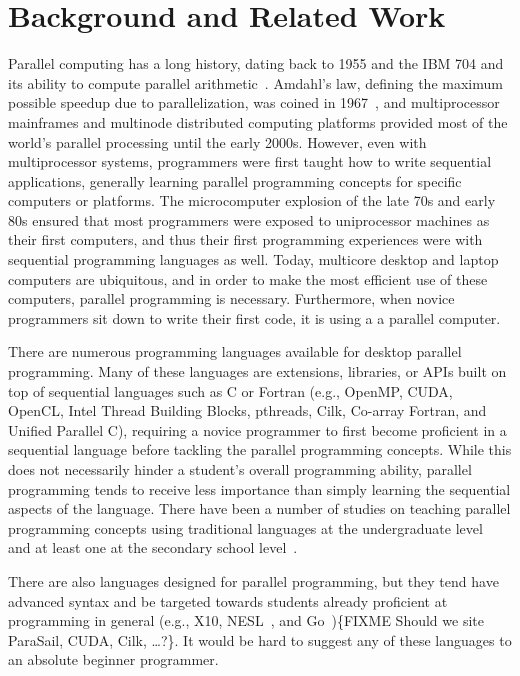 \documentclass{sig-alternate}
\newcommand{\FIXME}[1]{{\color{red}\{FIXME #1\}}}
\begin{document}
\section{Background and Related Work}

Parallel computing has a long history, dating back to 1955 and the IBM 704
and its ability to compute parallel arithmetic~\cite{hockney1988parallel}.  Amdahl's law,
defining the maximum possible speedup due to parallelization, was coined in 
1967~\cite{amdahl1967validity}, and multiprocessor mainframes and multinode distributed
computing platforms provided most of the world's parallel processing until the early 2000s.
However, even with multiprocessor systems, programmers were first taught how to write
sequential applications, generally learning parallel programming concepts for specific
computers or platforms.  The microcomputer explosion of the late 70s and early 80s
ensured that most programmers were exposed to uniprocessor machines as their first computers,
and thus their first programming experiences were with sequential programming languages as well.
Today, multicore desktop and laptop computers are ubiquitous, and in order to make the most
efficient use of these computers, parallel programming is necessary.  Furthermore, when novice
programmers sit down to write their first code, it is using a a parallel computer.

There are numerous programming languages available for desktop parallel programming.  Many of
these languages are extensions, libraries, or APIs built on top of sequential languages such 
as C or Fortran (e.g., OpenMP, CUDA, 
OpenCL, Intel Thread Building Blocks, pthreads, Cilk,
Co-array Fortran, and Unified Parallel C),
requiring a novice programmer to first become proficient in a sequential language before
tackling the parallel programming concepts.  While this does not necessarily hinder a student's
overall programming ability, parallel programming tends to receive less importance than simply
learning the sequential aspects of the language.  There have been a number of studies on teaching 
parallel programming concepts using traditional languages at the 
undergraduate level~\cite{freshmanParallel,undergraduateParallel,gridPortal} 
and at least one at the secondary school level~\cite{highSchoolParallel}.

There are also languages designed for parallel programming, but they tend have advanced
syntax and be targeted towards
students already proficient at programming in general (e.g., X10\cite{X10}, 
NESL~\cite{nesl-impl-94}, and Go~\cite{GoLanguage})\FIXME{Should we site ParaSail, CUDA, Cilk, \dots?}.  It would be hard to suggest any of these
languages to an absolute beginner programmer.
\end{document}
